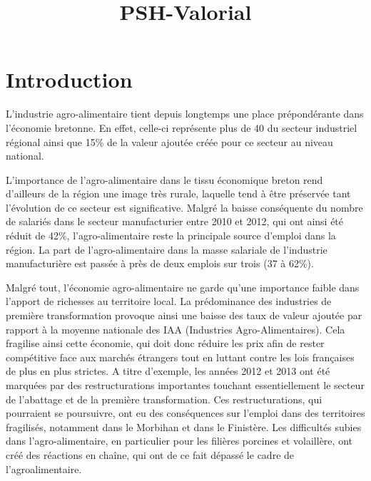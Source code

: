 \documentclass[a4paper,10pt]{report}
\title{PSH-Valorial}
\author{ \bsc{Aurélien Fontaine}
	\and \bsc{Manuteau Huang} 
	\and \bsc{Nicolas Le Borgne}
	\and \bsc{Maxime Cadoret}
	\and \bsc{Flavien Lecuyer}
}
\begin{document}
	\maketitle
	\setcounter{tocdepth}{2}
	\tableofcontents
	
\chapter{Introduction}
	 L’industrie agro-alimentaire tient depuis longtemps une place prépondérante dans l’économie bretonne. En effet, celle-ci représente plus de 40 du secteur industriel régional ainsi que 15\% de la valeur ajoutée créée pour ce secteur au niveau national. 
	 
	 L’importance de l’agro-alimentaire dans le tissu économique breton rend d’ailleurs de la région une image très rurale, laquelle tend à être préservée tant l’évolution de ce secteur est significative. Malgré la baisse conséquente du nombre de salariés dans le secteur manufacturier entre 2010 et 2012, qui ont ainsi été réduit de 42\%, l’agro-alimentaire reste la principale source d’emploi dans la région. La part de l’agro-alimentaire dans la masse salariale de l’industrie manufacturière est passée à près de deux emplois sur trois (37 à 62\%).
	 
	 Malgré tout, l’économie agro-alimentaire ne garde qu’une importance faible dans l’apport de richesses au territoire local. La prédominance des industries de première transformation provoque ainsi une baisse des taux de valeur ajoutée par rapport à la moyenne nationale des IAA (Industries Agro-Alimentaires). Cela fragilise ainsi cette économie, qui doit donc réduire les prix afin de rester compétitive face aux marchés étrangers tout en luttant contre les lois françaises de plus en plus strictes. A titre d’exemple, les années 2012 et 2013 ont été marquées par des restructurations importantes touchant essentiellement le secteur de l’abattage et de la première transformation. Ces restructurations, qui pourraient se poursuivre, ont eu des conséquences sur l’emploi dans des territoires fragilisés, notamment dans le Morbihan et dans le Finistère. Les difficultés subies dans l’agro-alimentaire, en particulier pour les filières porcines et volaillère, ont créé des réactions en chaîne, qui ont de ce fait dépassé le cadre de l’agroalimentaire.
	 
\end{document}
